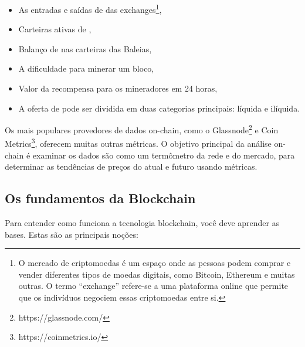 \documentclass[a4paper,12pt]{article}
\begin{document}
\begin{itemize}
    \item As entradas e saídas de \btcspace das exchanges\footnote{O mercado de criptomoedas é um espaço 
    onde as pessoas podem comprar e vender diferentes tipos de moedas digitais, como Bitcoin, 
    Ethereum e muitas outras. O termo ``exchange'' refere-se a uma plataforma online que permite 
    que os indivíduos negociem essas criptomoedas entre si.}, 
    \item Carteiras ativas de \btc, 
    \item Balan\c{c}o de \btcspace nas carteiras das Baleias,
    \item A dificuldade para minerar um bloco,
    \item Valor da recompensa para os mineradores em 24 horas,
    \item A oferta de \btcspace pode ser dividida em duas categorias principais: líquida e ilíquida.
\end{itemize}

Os mais populares provedores de dados on-chain, como o Glassnode\footnote{https://glassnode.com/} e 
Coin Metrics\footnote{https://coinmetrics.io/}, oferecem 
muitas outras m\'etricas. O objetivo principal da an\'alise on-chain é examinar 
os dados s\~ao como um term\^ometro da rede \btcspace e do mercado, para determinar as tendências 
de preços do \btcspace atual e futuro usando métricas.

\subsection{Os fundamentos da Blockchain}

\hspace{0.5cm}Para entender como funciona a tecnologia blockchain, você deve aprender as bases. 
Estas são as principais noções:
\end{document}
